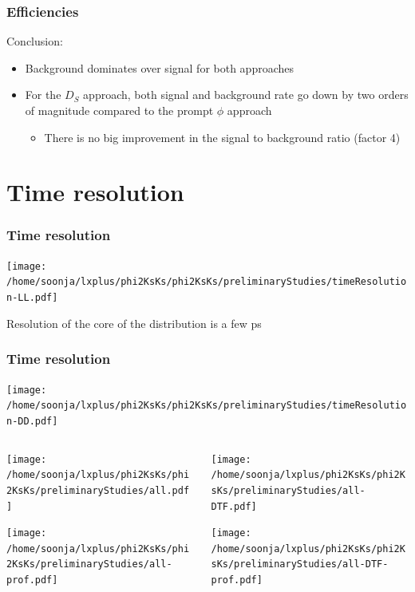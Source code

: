 \documentclass{beamer}
\begin{document}
\begin{frame}
\frametitle{Efficiencies}
Conclusion:
\begin{itemize}
\item Background dominates over signal for both approaches
\item For the $D_S$ approach, both signal and background rate go down by two orders of magnitude compared to the prompt $\phi$ approach
\begin{itemize}
\item There is no big improvement in the signal to background ratio (factor 4)
\end{itemize}
\end{itemize}

\end{frame}

\section{Time resolution}
\begin{frame}
\frametitle{Time resolution}
\vspace*{-4mm}
\begin{center}
\texttt{[image: /home/soonja/lxplus/phi2KsKs/phi2KsKs/preliminaryStudies/timeResolution-LL.pdf]}
\end{center}
\vspace*{-4mm}
Resolution of the core of the distribution is a few ps
\end{frame}


\begin{frame}[fragile]
\frametitle{Time resolution}

\begin{center}
\texttt{[image: /home/soonja/lxplus/phi2KsKs/phi2KsKs/preliminaryStudies/timeResolution-DD.pdf]}
\end{center}

\end{frame}

\begin{frame}[fragile]
\begin{columns}
\begin{column}{.49\columnwidth}
\texttt{[image: /home/soonja/lxplus/phi2KsKs/phi2KsKs/preliminaryStudies/all.pdf]}

\texttt{[image: /home/soonja/lxplus/phi2KsKs/phi2KsKs/preliminaryStudies/all-prof.pdf]}

\end{column}
\begin{column}{.49\columnwidth}
\texttt{[image: /home/soonja/lxplus/phi2KsKs/phi2KsKs/preliminaryStudies/all-DTF.pdf]}

\texttt{[image: /home/soonja/lxplus/phi2KsKs/phi2KsKs/preliminaryStudies/all-DTF-prof.pdf]}

\end{column}
\end{columns}

\end{frame}
\end{document}
